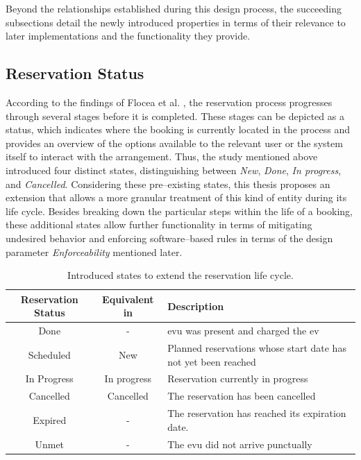 \noindent Beyond the relationships established during this design process, the succeeding subsections detail the newly introduced properties in terms of their relevance to later implementations and the functionality they provide.

\subsection{Reservation Status}
\label{ch:Design:sec:Reservation:ssec:Reservation Status}

According to the findings of Flocea et al. \cite{flocea_electric_2022}, the reservation process progresses through several stages before it is completed. These stages can be depicted as a status, which indicates where the booking is currently located in the process and provides an overview of the options available to the relevant user or the system itself to interact with the arrangement.
Thus, the study mentioned above introduced four distinct states, distinguishing between \textit{New}, \textit{Done}, \textit{In progress}, and \textit{Cancelled}.
Considering these pre--existing states, this thesis proposes an extension that allows a more granular treatment of this kind of entity during its life cycle. Besides breaking down the particular steps within the life of a booking, these additional states allow further functionality in terms of mitigating undesired behavior and enforcing software--based rules in terms of the design parameter \textit{Enforceability} mentioned later.

\begingroup
\setlength{\tabcolsep}{10pt} %
\renewcommand{\arraystretch}{1.5} %
\begin{table}[h]
    \centering
    \caption{Introduced states to extend the reservation life cycle.}
    \begin{tabular}{c|c|m{7cm}}
        Reservation Status & Equivalent in \cite{flocea_electric_2022} & Description \\ \hline
        Done & - & \acrshort{evu} was present and charged the \acrshort{ev} \\
        Scheduled & New & Planned reservations whose start date has not yet been reached \\
        In Progress & In progress & Reservation currently in progress \\
        Cancelled & Cancelled & The reservation has been cancelled \\
        Expired & - & The reservation has reached its expiration date. \\
        Unmet & - & The \acrshort{evu} did not arrive punctually
    \end{tabular}
    \label{tab:reservation-states}
\end{table}
\endgroup

